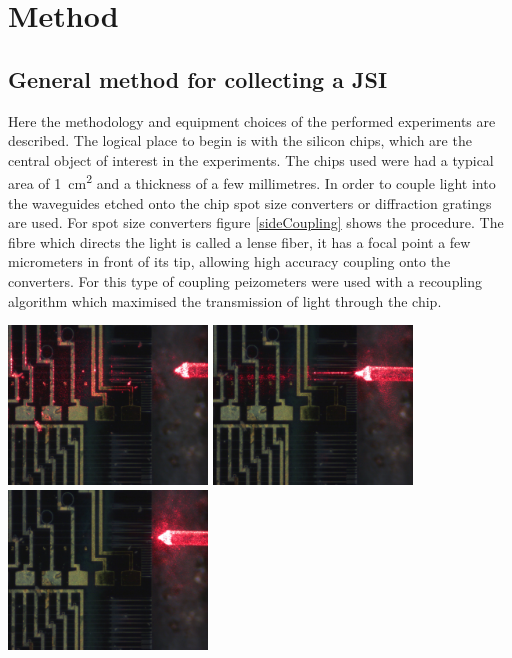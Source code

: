 \section{Method}
\subsection{General method for collecting a JSI}
Here the methodology and equipment choices of the performed experiments are described. The logical place to begin is with the silicon chips, which are the central object of interest in the experiments. The chips used were had a typical area of \SI{1}{\centi\meter^2} and a thickness of a few millimetres. In order to couple light into the waveguides etched onto the chip spot size converters or diffraction gratings are used. For spot size converters figure \ref{sideCoupling} shows the procedure. The fibre which directs the light is called a lense fiber, it has a focal point a few micrometers in front of its tip, allowing high accuracy coupling onto the converters. For this type of coupling peizometers were used with a recoupling algorithm which maximised the transmission of light through the chip.
\newline

\begingroup
    \centering  
    \includegraphics[width=5.3cm]{img/method/chipPictures/redLaser_aboveChip.jpg}
    \includegraphics[width=5.3cm]{img/method/chipPictures/redLaser_coupled.jpg}
    \includegraphics[width=5.3cm]{img/method/chipPictures/redLaser_belowChip.jpg}
     \vspace{3pt} \label{sideCoupling}
\endgroup

